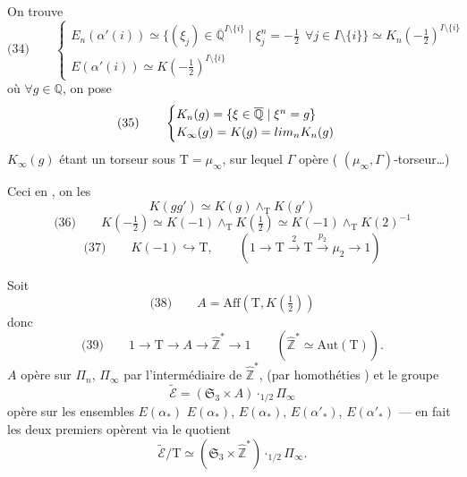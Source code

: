 \documentclass[11pt,a4paper]{article}
\begin{document}
On trouve
\[
  \text{(34)} \qquad
  \begin{cases}
    E_n(\alpha'(i)) \simeq \{(\xi_j) \in \overline{\mathbb{Q}}^{I \setminus \{i\}} \mid \xi_j^{n} = -\tfrac12 \ \ \forall j \in I \setminus \{i\}\} \simeq K_n(-\tfrac12)^{I \setminus \{i\}} \\
    E(\alpha'(i)) \simeq K(-\tfrac12)^{I \setminus \{i\}}
  \end{cases}
\]
où $\forall g \in \mathbb{Q}$, on pose
\[
  \text{(35)} \qquad
  \begin{cases}
    K_n(g) = \{\xi \in \overline{\mathbb{Q}} \mid \xi^{n} = g\} \\
    K_\infty(g) = K(g) = \varprojlim_{n} K_n(g)
  \end{cases}
\]
$K_\infty(g)$ étant un torseur sous $\mathrm{T} = \mu_\infty$, sur lequel $\Gamma$ opère  ( $(\mu_\infty, \Gamma)$-torseur\ldots)

Ceci en , on  les 
\[
  K(gg') \simeq K(g) \wedge_{\mathrm{T}} K(g')
\]
\[
  \text{(36)} \qquad K(-\tfrac12) \simeq K(-1) \wedge_{\mathrm{T}} K(\tfrac12) \simeq K(-1) \wedge_{\mathrm{T}} K(2)^{-1}
\]
\[
  \text{(37)} \qquad K(-1) \hookrightarrow \mathrm{T}, \qquad (1 \to \mathrm{T} \xrightarrow{\ 2\ } \mathrm{T} \xrightarrow{\ p_2\ } \mu_2 \to 1)
\]

Soit
\[
  \text{(38)} \qquad A = \mathrm{Aff}(\mathrm{T}, K(\tfrac12))
\]
donc
\[
  \text{(39)} \qquad 1 \longrightarrow \mathrm{T} \longrightarrow A \longrightarrow \widehat{\mathbb{Z}}^{*} \longrightarrow 1 \qquad (\widehat{\mathbb{Z}}^{*} \simeq \mathrm{Aut}(\mathrm{T})) .
\]
 
$A$ opère sur $\Pi_n$, $\Pi_\infty$  par l'intermédiaire de $\widehat{\mathbb{Z}}^{*}$,  (par homothéties \uncertain{\ldots}) et le groupe
\[
  \widetilde{\mathcal{E}} = (\mathfrak{S}_3 \times A) \cdot_{1/2} \Pi_\infty
\]
opère  sur les ensembles $E(\alpha_{*})$ \struck{\ill{}} $E(\alpha_{*})$, $E(\alpha_{*})$, $E(\alpha'_{*})$, $E(\alpha'_{*})$ --- en fait les deux premiers opèrent via le quotient 
\[
  \widetilde{\mathcal{E}}/\mathrm{T} \simeq (\mathfrak{S}_3 \times \widehat{\mathbb{Z}}^{*}) \cdot_{1/2} \Pi_\infty .
\]
\end{document}
